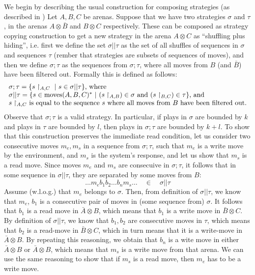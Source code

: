 We begin by describing the usual construction for composing strategies (as described in \cite[p.12]{abramsky2013semantics})
Let $A, B, C$ be arenas. Suppose that we have two strategies $\sigma$ and $\tau$, in the arenas $A \otimes \bar B$ and $B \otimes C$ respectively. These can be composed as strategy copying construction to get a new strategy in the arena $A \otimes C$
as ``shuffling plus hiding'', i.e. first we define the set $\sigma || \tau$ as the set of all shuffles of sequences in $\sigma$ 
and sequences $\tau$ (rember that strategies are subsets of sequences of moves), and then we define $\sigma; \tau$ as the 
sequences from $\sigma; \tau$, where all moves from $B$ (and $\bar{B}$) have been filtered out. Formally this is defined as follows:
\[ \begin{tabular}{l}
    $\sigma ; \tau = \{ s \restriction_{A, C} \ | \ s \in \sigma || \tau  \}$, where\\
    $\sigma || \tau = \{ s \in \textrm{moves}(A, B, C)^* \ | \ (s\restriction_{A, B}) \in \sigma \textrm{ and } (s\restriction_{B, C}) \in \tau \}$, and\\
    $s \restriction_{A, C}$ is equal to the sequence $s$ where all moves from $B$ have been filtered out. 
\end{tabular}
\]
Observe that $\sigma; \tau$ is a valid strategy. In particular,
if plays in $\sigma$ are bounded by $k$ and plays in $\tau$ are bounded by $l$,
then plays in $\sigma ; \tau$ are bounded by $k + l$. To show that this construction 
preserves the immediate read condition, let us consider two consecutive moves 
$m_e, m_s$ in a sequence from $\sigma;\tau$,
such that $m_e$ is a write move by the environment, 
and $m_s$ is the system's response, and let us show 
that $m_s$ is a read move. Since moves $m_e$ and $m_s$ are consecuive in 
$\sigma ; \tau$, it follows that in some sequence in $\sigma || \tau$, 
they are separated by some moves from $B$:
\[ \ldots m_e b_1 b_2 \ldots b_n m_s \ldots \quad \in \quad \sigma || \tau \]
Assume (w.l.o.g.) that $m_e$ belongs to $\sigma$.
Then, from definition of $\sigma || \tau$,
we know that $m_e$, $b_1$ is a consecutive pair of moves in (some sequence from) $\sigma$. 
It follows that $b_1$ is a read move in $\bar{A} \otimes B$,
which means that $b_1$ is a write move in $\bar{B} \otimes C$. 
By definition of $\sigma || \tau$, we know that $b_1, b_2$
are consecutive moves in $\tau$, which means that $b_2$ is 
a read-move in $\bar{B} \otimes C$, which in turn means that 
it is a write-move in $\bar{A} \otimes B$. By repeating this reasoning, 
we obtain that $b_n$ is a wite move in either $\bar{A} \otimes B$ or
$\bar{A} \otimes B$, which means that $m_s$ is a write move from that arena.
We can use the same reasoning to show that if $m_s$ is a read move, 
then $m_e$ has to be a write move.  


